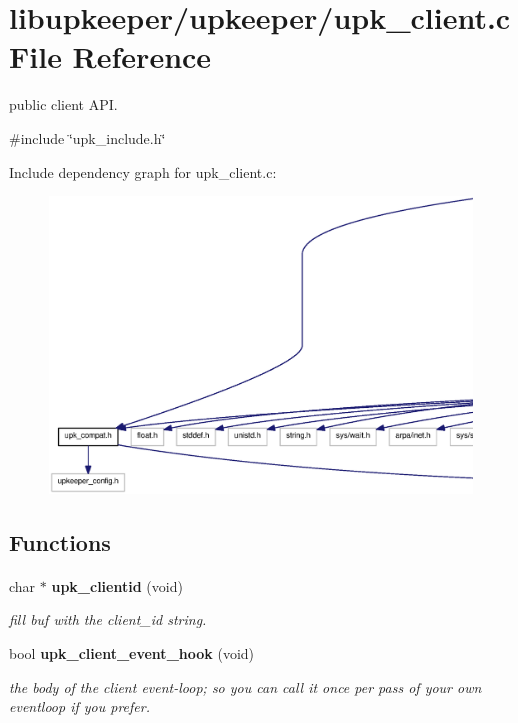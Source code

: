 \section{libupkeeper/upkeeper/upk\_\-client.c File Reference}
\label{upk__client_8c}


public client API.  


{\ttfamily \#include \char`\"{}upk\_\-include.h\char`\"{}}\par
Include dependency graph for upk\_\-client.c:\nopagebreak
\begin{figure}[H]
\begin{center}
\leavevmode
\includegraphics[width=400pt]{upk__client_8c__incl}
\end{center}
\end{figure}
\subsection*{Functions}
\paragraph*{}
\begin{DoxyCompactItemize}
\item 
char $\ast$ {\bf upk\_\-clientid} (void)
\begin{DoxyCompactList}\small\item\em fill buf with the client\_\-id string. \end{DoxyCompactList}\item 
bool {\bf upk\_\-client\_\-event\_\-hook} (void)
\begin{DoxyCompactList}\small\item\em the body of the client event-\/loop; so you can call it once per pass of your own eventloop if you prefer. \end{DoxyCompactList}\end{DoxyCompactItemize}



